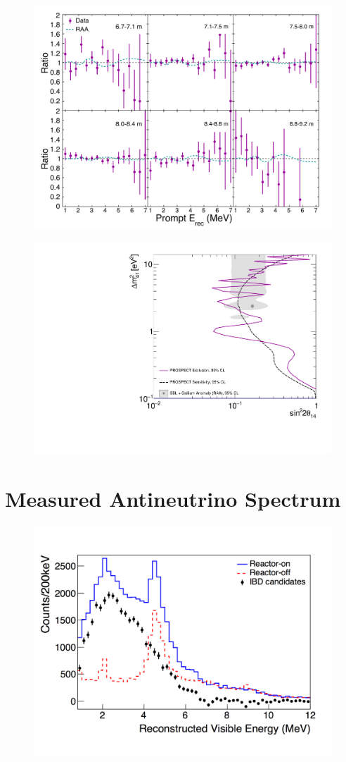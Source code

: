 \begin{figure}[H]
	\centering
	\includegraphics[width=0.7\linewidth]{tex/7-oscillation-images/BaselineSpectra}
	\caption{}
	\label{fig:baselinespectra}
\end{figure}

\begin{figure}[H]
	\centering
	\includegraphics[width=0.7\linewidth]{tex/7-oscillation-images/Exclusion_Sensitivity_Final}
	\caption{}
	\label{fig:exclusionsensitivityfinal}
\end{figure}



\section{Measured Antineutrino Spectrum}
\begin{figure}[H]
	\centering
	\includegraphics[width=0.7\linewidth]{tex/7-oscillation-images/Spectrum}
	\caption{}
	\label{fig:spectrumresults}
\end{figure}



